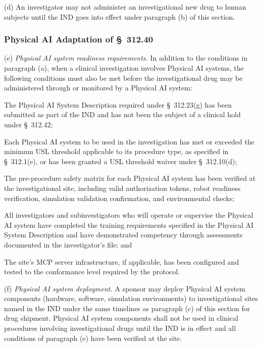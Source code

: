 (d) An investigator may not administer an investigational new drug to human subjects until the IND goes into effect under paragraph (b) of this section.

\subsubsection{Physical AI Adaptation of \S~312.40}

(e) \textit{Physical AI system readiness requirements.} In addition to the conditions in paragraph (a), when a clinical investigation involves Physical AI systems, the following conditions must also be met before the investigational drug may be administered through or monitored by a Physical AI system:

\begin{description}[leftmargin=0.8cm,style=sameline]
\item[(i)] The Physical AI System Description required under \S~312.23(g) has been submitted as part of the IND and has not been the subject of a clinical hold under \S~312.42;
\item[(ii)] Each Physical AI system to be used in the investigation has met or exceeded the minimum USL threshold applicable to its procedure type, as specified in \S~312.1(e), or has been granted a USL threshold waiver under \S~312.10(d);
\item[(iii)] The pre-procedure safety matrix for each Physical AI system has been verified at the investigational site, including valid authorization tokens, robot readiness verification, simulation validation confirmation, and environmental checks;
\item[(iv)] All investigators and subinvestigators who will operate or supervise the Physical AI system have completed the training requirements specified in the Physical AI System Description and have demonstrated competency through assessments documented in the investigator's file; and
\item[(v)] The site's MCP server infrastructure, if applicable, has been configured and tested to the conformance level required by the protocol.
\end{description}

(f) \textit{Physical AI system deployment.} A sponsor may deploy Physical AI system components (hardware, software, simulation environments) to investigational sites named in the IND under the same timelines as paragraph (c) of this section for drug shipment. Physical AI system components shall not be used in clinical procedures involving investigational drugs until the IND is in effect and all conditions of paragraph (e) have been verified at the site.

